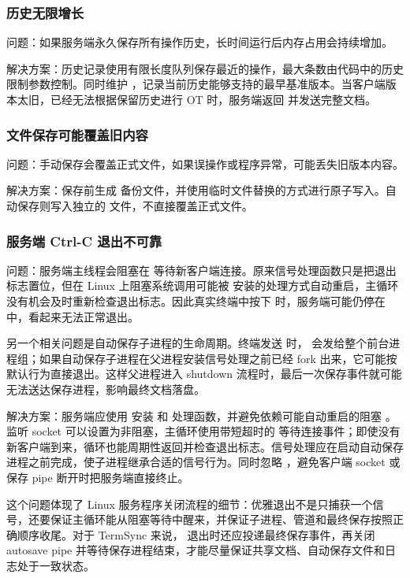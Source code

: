 \subsubsection{历史无限增长}

问题：如果服务端永久保存所有操作历史，长时间运行后内存占用会持续增加。

解决方案：历史记录使用有限长度队列保存最近的操作，最大条数由代码中的历史限制参数控制。同时维护 ，记录当前历史能够支持的最早基准版本。当客户端版本太旧，已经无法根据保留历史进行 OT 时，服务端返回  并发送完整文档。

\subsubsection{文件保存可能覆盖旧内容}

问题：手动保存会覆盖正式文件，如果误操作或程序异常，可能丢失旧版本内容。

解决方案：保存前生成  备份文件，并使用临时文件替换的方式进行原子写入。自动保存则写入独立的  文件，不直接覆盖正式文件。

\subsubsection{服务端 Ctrl-C 退出不可靠}

问题：服务端主线程会阻塞在  等待新客户端连接。原来信号处理函数只是把退出标志置位，但在 Linux 上阻塞系统调用可能被  安装的处理方式自动重启，主循环没有机会及时重新检查退出标志。因此真实终端中按下  时，服务端可能仍停在  中，看起来无法正常退出。

另一个相关问题是自动保存子进程的生命周期。终端发送  时， 会发给整个前台进程组；如果自动保存子进程在父进程安装信号处理之前已经 fork 出来，它可能按默认行为直接退出。这样父进程进入 shutdown 流程时，最后一次保存事件就可能无法送达保存进程，影响最终文档落盘。

解决方案：服务端应使用  安装  和  处理函数，并避免依赖可能自动重启的阻塞 。监听 socket 可以设置为非阻塞，主循环使用带短超时的  等待连接事件；即使没有新客户端到来，循环也能周期性返回并检查退出标志。信号处理应在启动自动保存进程之前完成，使子进程继承合适的信号行为。同时忽略 ，避免客户端 socket 或保存 pipe 断开时把服务端直接终止。

这个问题体现了 Linux 服务程序关闭流程的细节：优雅退出不是只捕获一个信号，还要保证主循环能从阻塞等待中醒来，并保证子进程、管道和最终保存按照正确顺序收尾。对于 TermSync 来说， 退出时还应投递最终保存事件，再关闭 autosave pipe 并等待保存进程结束，才能尽量保证共享文档、自动保存文件和日志处于一致状态。

